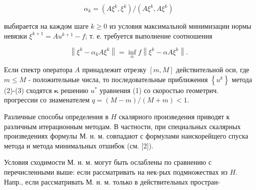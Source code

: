 \documentclass[10pt]{article}
\begin{document}
\[

\alpha_{k}=\left(A \xi^{k}, \xi^{k}\right) /\left(A \xi^{k}, A \xi^{k}\right)

\]



выбирается на каждом шаге $k \geqslant 0$ из условия максимальной минимизации нормы невязки $\xi^{k+1}=A u^{k+1}-f$; т. е. требуется выполнение соотношения



\[

\left\|\xi^{k}-\alpha_{k} A \xi^{k}\right\|=\inf _{\alpha} f\left\|\xi^{k}-\alpha A \xi^{k}\right\| .

\]



Если спектр оператора $A$ принадлежит отрезку $[m, M]$ действительной оси, где $m \leqslant M$ - положительные числа, то последовательные приближения $\left\{u^{k}\right\}$ метода (2)-(3) сходятся $\mathbf{\kappa}$ решению $u^{*}$ уравнения (1) со скоростью геометрич. прогрессии со знаменателем $q=(M-m) /(M+m)<1$.



Различные способы определения в $H$ скалярного произведения приводят к различным итерационным методам. В частности, при специальных скалярных произведениях формулы М. н. м. совпадают с формулами наискорейщего спуска метода и метода минимальных отшибок (см. [2]).



Условия сходимости М. н. м. могут быть ослаблены по сравнению с перечисленными выше: если рассматривать на нек-рых подмножествах из $H$. Напр., если рассматривать М. н. м. только в действительных простран-
\end{document}
